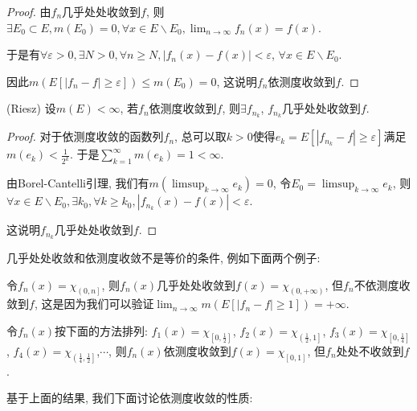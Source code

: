 \documentclass[theorem=false,mathfont=none,openany,sub3section]{easybook}
\begin{document}
\begin{proof}
  由$f_n$几乎处处收敛到$f$, 则$\exists E_0\subset E, m(E_0)=0, \forall x\in E\backslash E_0, \lim_{n \to \infty}f_n(x)=f(x)$.\par
  于是有$\forall \varepsilon >0, \exists N>0, \forall n\geqslant N, |f_n(x)-f(x)|<\varepsilon$, $\forall x\in E\backslash E_0$.\par
  因此$m\left(E\left[|f_n-f|\geqslant \varepsilon\right]\right)\leqslant m(E_0)=0$, 这说明$f_n$依测度收敛到$f$.\par
\end{proof}

\begin{theorem}
  (Riesz) 设$m(E)<\infty$, 若$f_n$依测度收敛到$f$, 则$\exists f_{n_k}$, $f_{n_k}$几乎处处收敛到$f$.\par
\end{theorem}

\begin{proof}
  对于依测度收敛的函数列$f_n$, 总可以取$k>0$使得$e_k=E\left[|f_{n_k}-f|\geqslant \varepsilon\right]$满足$m(e_k)< \frac{1}{2^k}$. 于是$\sum_{k=1}^{\infty}m(e_k)=1<\infty$.\par
  由Borel-Cantelli引理, 我们有$m\left(\limsup_{k \to \infty}e_k\right)=0$, 令$E_0=\limsup_{k \to \infty}e_k$, 则$\forall x \in E\backslash E_0, \exists k_0, \forall k\geqslant k_0, |f_{n_k}(x)-f(x)|<\varepsilon$.\par
  这说明$f_{n_k}$几乎处处收敛到$f$.\par
\end{proof}

\begin{remark}
  几乎处处收敛和依测度收敛不是等价的条件, 例如下面两个例子:\par
  令$f_n(x)=\chi_{\left(\right.0,n\left.\right]}$, 则$f_n(x)$几乎处处收敛到$f(x)=\chi_{\left(\right.0,+\infty\left.\right)}$, 但$f_n$不依测度收敛到$f$, 这是因为我们可以验证$\lim_{n \to \infty}m\left(E\left[|f_n-f|\geqslant 1\right]\right) = +\infty$.\par
  令$f_n(x)$按下面的方法排列: $f_1(x)=\chi_{\left[\right.0,\frac{1}{2}\left.\right]}$, $f_2(x)=\chi_{\left(\right.\frac{1}{2},1\left.\right]}$, $f_3(x)=\chi_{\left[\right.0,\frac{1}{4}\left.\right]}$, $f_4(x)=\chi_{\left(\right.\frac{1}{4},\frac{1}{2}\left.\right]}$,$\cdots$, 则$f_n(x)$依测度收敛到$f(x)=\chi_{\left[\right.0,1\left.\right]}$, 但$f_n$处处不收敛到$f$.\par
\end{remark}

基于上面的结果, 我们下面讨论依测度收敛的性质:\par
\end{document}
